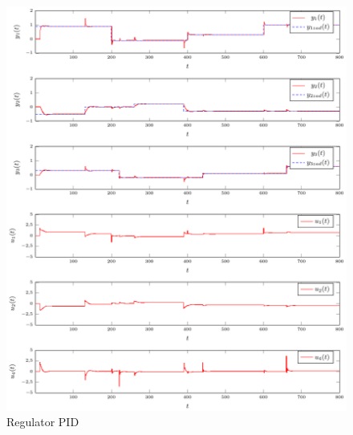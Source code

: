 \documentclass[a4paper,titlepage,11pt,twosides,floatssmall]{mwrep}
\begin{document}
\begin{figure}[H]
	\centering
	\includegraphics[scale=1]{../wykresy/zad5_pid.pdf}
	\caption{Regulator PID}
\end{figure}
\end{document}
